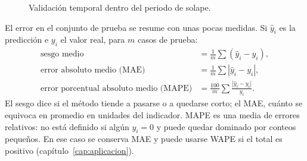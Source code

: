 \begin{figure}[ht]
\centering
{}
\caption{Validación temporal dentro del periodo de solape.}
\label{fig:validacion}
\end{figure}

El error en el conjunto de prueba se resume con unas pocas medidas. Si $\hat{y}_i$ es la
predicción e $y_i$ el valor real, para $m$ casos de prueba:
\begin{align}
  \text{sesgo medio} &= \frac{1}{m}\sum (\hat{y}_i - y_i), \\
  \text{error absoluto medio (MAE)} &= \frac{1}{m}\sum |\hat{y}_i - y_i|, \\
  \text{error porcentual absoluto medio (MAPE)} &= \frac{100}{m}\sum \frac{|\hat{y}_i - y_i|}{y_i} .
\end{align}
El sesgo dice si el método tiende a pasarse o a quedarse corto; el MAE, cuánto se equivoca en
promedio en unidades del indicador. MAPE es una media de errores relativos: no está
definido si algún $y_i=0$ y puede quedar dominado por conteos pequeños. En ese caso
se conserva MAE y puede usarse WAPE si el total es positivo (capítulo~\ref{cap:aplicacion}).

